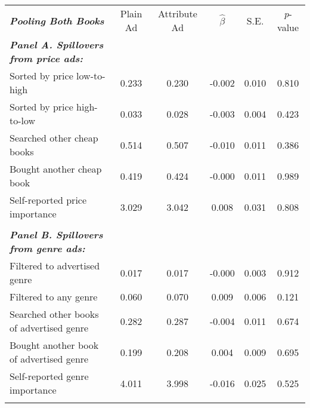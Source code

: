\begin{center}
\begin{tabular}{lccccc}
\hline \noalign{\smallskip}\textbf{\emph{Pooling Both Books}} & Plain Ad & Attribute Ad & $\hat{\beta}$ & S.E. & \emph{p}-value\\
\noalign{\smallskip}\hline \noalign{\smallskip}\textbf{\emph{Panel A. Spillovers from price ads:}} &  &  &  &  & \\
\hspace{5pt} Sorted by price low-to-high & 0.233 & 0.230 & -0.002 & 0.010 & 0.810\\
\hspace{5pt} Sorted by price high-to-low & 0.033 & 0.028 & -0.003 & 0.004 & 0.423\\
\hspace{5pt} Searched other cheap books & 0.514 & 0.507 & -0.010 & 0.011 & 0.386\\
\hspace{5pt} Bought another cheap book & 0.419 & 0.424 & -0.000 & 0.011 & 0.989\\
\hspace{5pt} Self-reported price importance & 3.029 & 3.042 & 0.008 & 0.031 & 0.808\\
  &  &  &  &  & \\
\textbf{\emph{Panel B. Spillovers from genre ads:}} &  &  &  &  & \\
\hspace{5pt} Filtered to advertised genre & 0.017 & 0.017 & -0.000 & 0.003 & 0.912\\
\hspace{5pt} Filtered to any genre & 0.060 & 0.070 & 0.009 & 0.006 & 0.121\\
\hspace{5pt} Searched other books of advertised genre & 0.282 & 0.287 & -0.004 & 0.011 & 0.674\\
\hspace{5pt} Bought another book of advertised genre & 0.199 & 0.208 & 0.004 & 0.009 & 0.695\\
\hspace{5pt} Self-reported genre importance & 4.011 & 3.998 & -0.016 & 0.025 & 0.525\\
\noalign{\smallskip}\hline\end{tabular}\\
\end{center}
